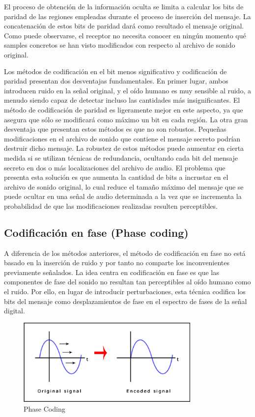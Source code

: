 \documentclass[12pt]{article}
\begin{document}
El proceso de obtención de la información oculta se limita a calcular los bits de paridad de las regiones empleadas durante el proceso de inserción del mensaje. La concatenación de estos bits de paridad dará como resultado el mensaje original. Como puede observarse, el receptor no necesita conocer en ningún momento qué samples concretos se han visto modificados con respecto al archivo de sonido original.

\bigskip

Los métodos de codificación en el bit menos significativo y codificación de paridad presentan dos desventajas fundamentales. En primer lugar, ambos introducen ruido en la señal original, y el oído humano es muy sensible al ruido, a menudo siendo capaz de detectar incluso las cantidades más insignificantes. El método de codificación de paridad es ligeramente mejor en este aspecto, ya que asegura que sólo se modificará como máximo un bit en cada región. La otra gran desventaja que presentan estos métodos es que no son robustos. Pequeñas modificaciones en el archivo de sonido que contiene el mensaje secreto podrían destruir dicho mensaje. La robustez de estos métodos puede aumentar en cierta medida si se utilizan técnicas de redundancia, ocultando cada bit del mensaje secreto en dos o más localizaciones del archivo de audio. El problema que presenta esta solución es que aumenta la cantidad de bits a incrustar en el archivo de sonido original, lo cual reduce el tamaño máximo del mensaje que se puede ocultar en una señal de audio determinada a la vez que se incrementa la probabilidad de que las modificaciones realizadas resulten perceptibles.

\subsection{Codificación en fase (Phase coding)}

A diferencia de los métodos anteriores, el método de codificación en fase no está basado en la inserción de ruido y por tanto no comparte los inconvenientes previamente señalados. La idea centra en codificación en fase es que las componentes de fase del sonido no resultan tan perceptibles al oído humano como el ruido. Por ello, en lugar de introducir perturbaciones, esta técnica codifica los bits del mensaje como desplazamientos de fase en el espectro de fases de la señal digital.

\begin{figure}
  \centering
    \includegraphics[width=0.8\textwidth]{img/phaseshift}
  \caption{Phase Coding}
  \label{phasecoding}
\end{figure}
\end{document}
